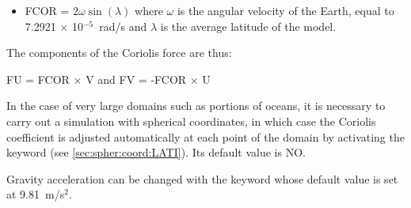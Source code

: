 \begin{itemize}
\item  FCOR = $2 \omega  \sin (\lambda )$ where $\omega$ is the angular
velocity of the Earth, equal to 7.2921 $\times$ 10$^{-5}$~rad/s
and $\lambda$ is the average latitude of the model.
\end{itemize}

The components of the Coriolis force are thus:

FU = FCOR $\times$ V          and          FV = -FCOR $\times$ U

In the case of very large domains such as portions of oceans, it is necessary
to carry out a simulation with spherical coordinates, in which case the
Coriolis coefficient is adjusted automatically at each point of the domain
by activating the keyword 
(see \ref{sec:spher:coord:LATI}).
Its default value is NO.

Gravity acceleration can be changed with the keyword 
whose default value is set at 9.81~m/s$^2$.
